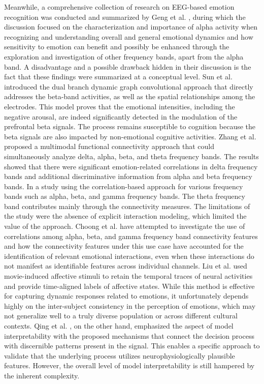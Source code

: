 \documentclass{WileyMSP-template}
\begin{document}
Meanwhile, a comprehensive collection of research on EEG-based emotion recognition was conducted and summarized by Geng et al. \cite{geng2025dlreview}, during which the discussion focused on the characterization and importance of alpha activity when recognizing and understanding overall and general emotional dynamics and how sensitivity to emotion can benefit and possibly be enhanced through the exploration and investigation of other frequency bands, apart from the alpha band. A disadvantage and a possible drawback hidden in their discussion is the fact that these findings were summarized at a conceptual level. Sun et al. \cite{sun2022_db_dgcn_atffn} introduced the dual branch dynamic graph convolutional approach that directly addresses the beta-band activities, as well as the spatial relationships among the electrodes. This model proves that the emotional intensities, including the negative arousal, are indeed significantly detected in the modulation of the prefrontal beta signals. The process remains susceptible to cognition because the beta signals are also impacted by non-emotional cognitive activities. Zhang et al. \cite{zhang2023_multifreq_fc_emotion} proposed a multimodal functional connectivity approach that could simultaneously analyze delta, alpha, beta, and theta frequency bands. The results showed that there were significant emotion-related correlations in delta frequency bands and additional discriminative information from alpha and beta frequency bands.
In a study using the correlation-based approach for various frequency bands such as alpha, beta, and gamma frequency bands. The theta frequency band contributes mainly through the connectivity measures. The limitations of the study were the absence of explicit interaction modeling, which limited the value of the approach. Choong et al. \cite{choong2021_corr_alpha_beta_gamma} have attempted to investigate the use of correlations among alpha, beta, and gamma frequency band connectivity features and how the connectivity features under this use case have accounted for the identification of relevant emotional interactions, even when these interactions do not manifest as identifiable features across individual channels. Liu et al. \cite{liu2018_realtime_movie_induced} used movie-induced affective stimuli to retain the temporal traces of neural activities and provide time-aligned labels of affective states. While this method is effective for capturing dynamic responses related to emotions, it unfortunately depends highly on the inter-subject consistency in the perception of emotions, which may not generalize well to a truly diverse population or across different cultural contexts. Qing et al. \cite{qing2019_interpretable_eeg_emotion}, on the other hand, emphasized the aspect of model interpretability with the proposed mechanisms that connect the decision process with discernible patterns present in the signal. This enables a specific approach to validate that the underlying process utilizes neurophysiologically plausible features. However, the overall level of model interpretability is still hampered by the inherent complexity.
\end{document}

